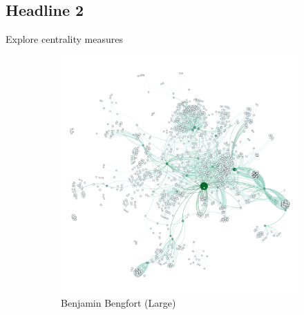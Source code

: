 \documentclass[11pt,letterpaper]{article}
\begin{document}
\subsection*{Headline 2}

Explore centrality measures

\begin{figure}[h]
	\centering
	\begin{subfigure}{0.49\textwidth}
		\centering
		\includegraphics[width=\textwidth]{figures/benjamin_centrality.png}
		\caption{\textsf{Benjamin Bengfort (Large)}}
        \label{fig:benjamin_centrality}
	\end{subfigure} \hfill
	\begin{subfigure}{0.49\textwidth}
		\centering

\end{subfigure}
\end{figure}
\end{document}
